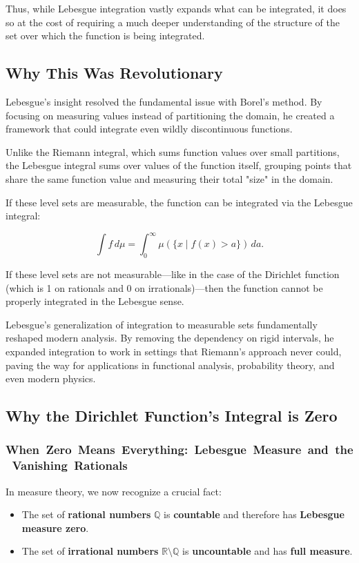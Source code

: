 Thus, while Lebesgue integration vastly expands what can be integrated, it does so at the cost of requiring a much deeper understanding of the structure of the set over which the function is being integrated.

\subsection{Why This Was Revolutionary}

Lebesgue’s insight resolved the fundamental issue with Borel’s method. By focusing on measuring values instead of partitioning the domain, he created a framework that could integrate even wildly discontinuous functions.

Unlike the Riemann integral, which sums function values over small partitions, the Lebesgue integral sums over values of the function itself, grouping points that share the same function value and measuring their total "size" in the domain. 

If these level sets are measurable, the function can be integrated via the Lebesgue integral:

\[
\int f \, d\mu = \int_0^\infty \mu(\{ x \mid f(x) > a \}) \, da.
\]

If these level sets are not measurable—like in the case of the Dirichlet function (which is 1 on rationals and 0 on irrationals)—then the function cannot be properly integrated in the Lebesgue sense.

Lebesgue’s generalization of integration to measurable sets fundamentally reshaped modern analysis. By removing the dependency on rigid intervals, he expanded integration to work in settings that Riemann’s approach never could, paving the way for applications in functional analysis, probability theory, and even modern physics.

\subsection{Why the Dirichlet Function's Integral is Zero}

\subsubsection{When Zero Means Everything: Lebesgue Measure and the Vanishing Rationals}

In measure theory, we now recognize a crucial fact:

\begin{itemize}
    \item The set of \textbf{rational numbers} \( \mathbb{Q} \) is \textbf{countable} and therefore has \textbf{Lebesgue measure zero}.
    \item The set of \textbf{irrational numbers} \( \mathbb{R} \setminus \mathbb{Q} \) is \textbf{uncountable} and has \textbf{full measure}.
\end{itemize}

